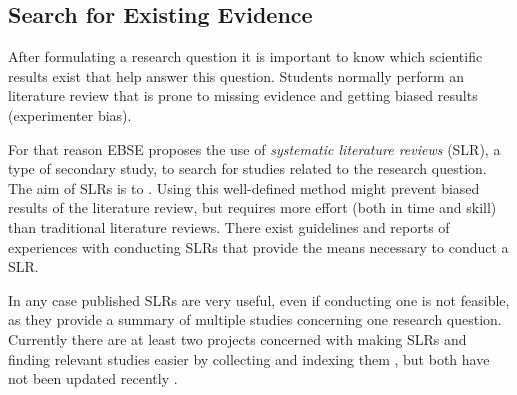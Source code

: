\subsection{Search for Existing Evidence}
\label{subsec:search for existing evidence} 

After formulating a research question it is important to know which scientific results exist that help answer this question. Students normally perform an  literature review that is prone to missing evidence and getting biased results (experimenter bias).

For that reason EBSE proposes the use of \emph{systematic literature reviews} (SLR), a type of secondary study, to search for studies related to the research question. The aim of SLRs is to  \cite{Zhang2011}. Using this well-defined method might prevent biased results of the literature review, but requires more effort (both in time and skill) than traditional literature reviews. There exist guidelines \cite{keele2007,Wohlin2014,Zhang2011}  and reports of experiences with conducting SLRs \cite{Brereton2007} that provide the means necessary to conduct a SLR.

In any case published SLRs are very useful, even if conducting one is not feasible, as they provide a summary of multiple studies concerning one research question. Currently there are at least two projects concerned with making SLRs and finding relevant studies easier by collecting and indexing them , but both have not been updated recently . 

